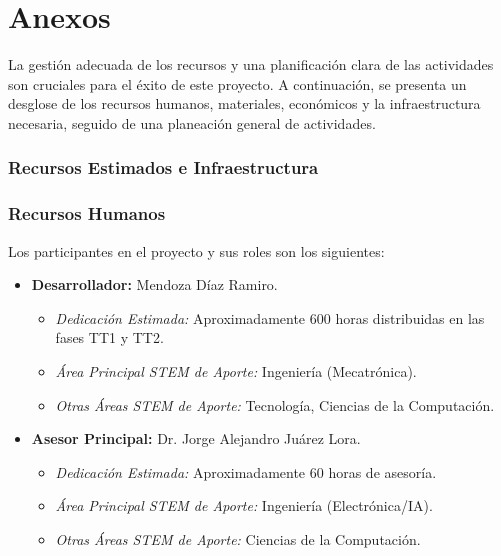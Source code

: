 \documentclass[12pt]{article}
\begin{document}
\section*{Anexos}
\label{sec:administracion_proyecto_listas}

La gestión adecuada de los recursos y una planificación clara de las actividades son cruciales para el éxito de este proyecto. A continuación, se presenta un desglose de los recursos humanos, materiales, económicos y la infraestructura necesaria, seguido de una planeación general de actividades.

\subsubsection{Recursos Estimados e Infraestructura}
\label{ssec:presupuesto_infraestructura_listas}

\subsubsection{Recursos Humanos}
\label{sssec:recursos_humanos_listas}
Los participantes en el proyecto y sus roles son los siguientes:
\begin{itemize}
    \item \textbf{Desarrollador:} Mendoza Díaz Ramiro.
        \begin{itemize}
            \item \textit{Dedicación Estimada:} Aproximadamente 600 horas distribuidas en las fases TT1 y TT2.
            \item \textit{Área Principal STEM de Aporte:} Ingeniería (Mecatrónica).
            \item \textit{Otras Áreas STEM de Aporte:} Tecnología, Ciencias de la Computación.
        \end{itemize}
    \item \textbf{Asesor Principal:} Dr. Jorge Alejandro Juárez Lora.
        \begin{itemize}
            \item \textit{Dedicación Estimada:} Aproximadamente 60 horas de asesoría.
            \item \textit{Área Principal STEM de Aporte:} Ingeniería (Electrónica/IA).
            \item \textit{Otras Áreas STEM de Aporte:} Ciencias de la Computación.
        \end{itemize}
\end{itemize}
\end{document}
